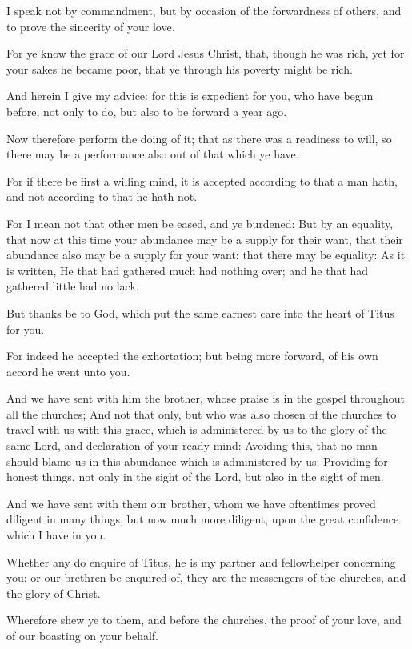 \Verse I speak not by commandment, but by occasion of the forwardness of others, and to prove the sincerity of your love.

\Verse For ye know the grace of our Lord Jesus Christ, that, though he was rich, yet for your sakes he became poor, that ye through his poverty might be rich.

\Verse And herein I give my advice: for this is expedient for you, who have begun before, not only to do, but also to be forward a year ago.

\Verse Now therefore perform the doing of it; that as there was a readiness to will, so there may be a performance also out of that which ye have.

\Verse For if there be first a willing mind, it is accepted according to that a man hath, and not according to that he hath not.

\Verse For I mean not that other men be eased, and ye burdened: \Verse But by an equality, that now at this time your abundance may be a supply for their want, that their abundance also may be a supply for your want: that there may be equality: \Verse As it is written, He that had gathered much had nothing over; and he that had gathered little had no lack.

\Verse But thanks be to God, which put the same earnest care into the heart of Titus for you.

\Verse For indeed he accepted the exhortation; but being more forward, of his own accord he went unto you.

\Verse And we have sent with him the brother, whose praise is in the gospel throughout all the churches; \Verse And not that only, but who was also chosen of the churches to travel with us with this grace, which is administered by us to the glory of the same Lord, and declaration of your ready mind: \Verse Avoiding this, that no man should blame us in this abundance which is administered by us: \Verse Providing for honest things, not only in the sight of the Lord, but also in the sight of men.

\Verse And we have sent with them our brother, whom we have oftentimes proved diligent in many things, but now much more diligent, upon the great confidence which I have in you.

\Verse Whether any do enquire of Titus, he is my partner and fellowhelper concerning you: or our brethren be enquired of, they are the messengers of the churches, and the glory of Christ.

\Verse Wherefore shew ye to them, and before the churches, the proof of your love, and of our boasting on your behalf.


